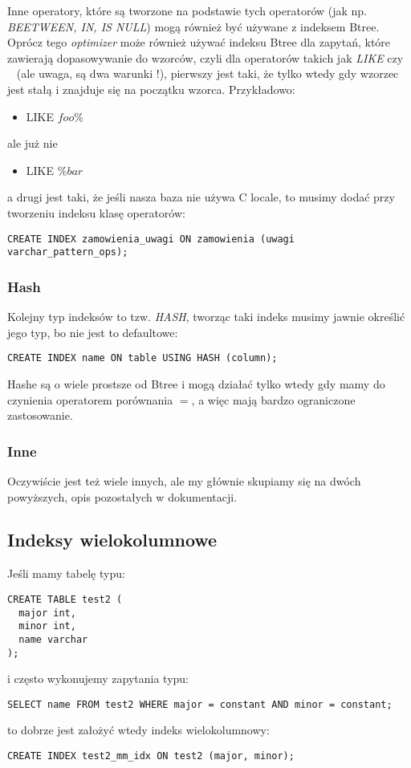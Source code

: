 \documentclass[a4paper,15pt]{article}
\begin{document}
Inne operatory, które są tworzone na podstawie tych operatorów (jak np. \textit{BEETWEEN, IN, IS NULL}) mogą również być używane z indeksem Btree. \\

Oprócz tego \textit{optimizer} może również używać indeksu Btree dla zapytań, które zawierają dopasowywanie do wzorców, czyli dla operatorów takich jak \textit{LIKE} czy \textit{~} (ale uwaga, są dwa warunki !), pierwszy jest taki, że tylko wtedy gdy wzorzec jest stałą i znajduje się na początku wzorca. Przykładowo:
\begin{itemize}
\item LIKE $foo\%$
\end{itemize} 
ale już nie
\begin{itemize}
\item LIKE $\%bar$
\end{itemize}
a drugi jest taki, że jeśli nasza baza nie używa C locale, to musimy dodać przy tworzeniu indeksu klasę operatorów:
\begin{lstlisting}
CREATE INDEX zamowienia_uwagi ON zamowienia (uwagi varchar_pattern_ops);
\end{lstlisting}


\subsubsection{Hash}

Kolejny typ indeksów to tzw. \textit{HASH}, tworząc taki indeks musimy jawnie określić jego typ, bo nie jest to defaultowe:
\begin{lstlisting}
CREATE INDEX name ON table USING HASH (column);
\end{lstlisting}

Hashe są o wiele prostsze od Btree i mogą działać tylko wtedy gdy mamy do czynienia operatorem porównania $=$, a więc mają bardzo ograniczone zastosowanie.

\subsubsection{Inne}
Oczywiście jest też wiele innych, ale my głównie skupiamy się na dwóch powyższych, opis pozostałych w dokumentacji.

\subsection{Indeksy wielokolumnowe}
Jeśli mamy tabelę typu:
\begin{lstlisting}
CREATE TABLE test2 (
  major int,
  minor int,
  name varchar
);
\end{lstlisting}
i często wykonujemy zapytania typu:
\begin{lstlisting}
SELECT name FROM test2 WHERE major = constant AND minor = constant;
\end{lstlisting}
to dobrze jest założyć wtedy indeks wielokolumnowy:
\begin{lstlisting}
CREATE INDEX test2_mm_idx ON test2 (major, minor);
\end{lstlisting}
\end{document}
